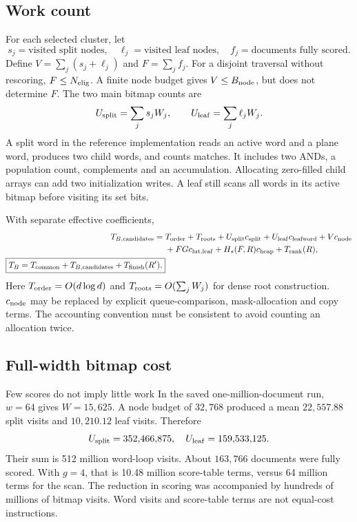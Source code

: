 \subsection{Work count}
For each selected cluster, let
\[
s_j=\text{visited split nodes},\quad
\ell_j=\text{visited leaf nodes},\quad
f_j=\text{documents fully scored}.
\]
Define $V=\sum_j(s_j+\ell_j)$ and $F=\sum_j f_j$. For a disjoint traversal without rescoring,
$F\leq N_{\mathrm{elig}}$. A finite node budget gives $V\leq B_{\rm node}$, but does not determine $F$.
The two main bitmap counts are
\begin{equation}
U_{\rm split}=\sum_j s_j W_j,\qquad
U_{\rm leaf}=\sum_j \ell_j W_j.
\label{eq:bitmap-work}
\end{equation}
A split word in the reference implementation reads an active word and a plane word, produces
two child words, and counts matches. It includes two ANDs, a population count, complements and
an accumulation. Allocating zero-filled child arrays can add two initialization writes.
A leaf still scans all words in its active bitmap before visiting its set bits.

With separate effective coefficients,
\begin{align}
T_{B,\rm candidates}={}&T_{\rm order}+T_{\rm roots}
 +U_{\rm split}c_{\rm split}+U_{\rm leaf}c_{\rm leafword}
 +V c_{\rm node} \notag\\
 &+F G c_{\rm lut,leaf}+H_s(F,R)c_{\rm heap}+T_{\rm rank}(R),
\label{eq:branch-time}\\
\boxed{T_B=T_{\mathrm{common}}+T_{B,\rm candidates}+T_{\mathrm{finish}}(R').}
\end{align}
Here $T_{\rm order}=O(d\log d)$ and $T_{\rm roots}=O(\sum_jW_j)$ for dense root construction.
$c_{\rm node}$ may be replaced by explicit queue-comparison, mask-allocation and copy terms.
The accounting convention must be consistent to avoid counting an allocation twice.

\subsection{Full-width bitmap cost}
\begin{examplebox}{Few scores do not imply little work}
In the saved one-million-document run, $w=64$ gives $W=15{,}625$. A node budget of $32{,}768$
produced a mean $22{,}557.88$ split visits and $10{,}210.12$ leaf visits. Therefore
\[
U_{\rm split}=352{,}466{,}875,\quad U_{\rm leaf}=159{,}533{,}125.
\]
Their sum is 512 million word-loop visits. About $163{,}766$ documents were fully scored.
With $g=4$, that is 10.48 million score-table terms, versus 64 million terms for the scan.
The reduction in scoring was accompanied by hundreds of millions of bitmap visits.
Word visits and score-table terms are not equal-cost instructions.
\end{examplebox}


